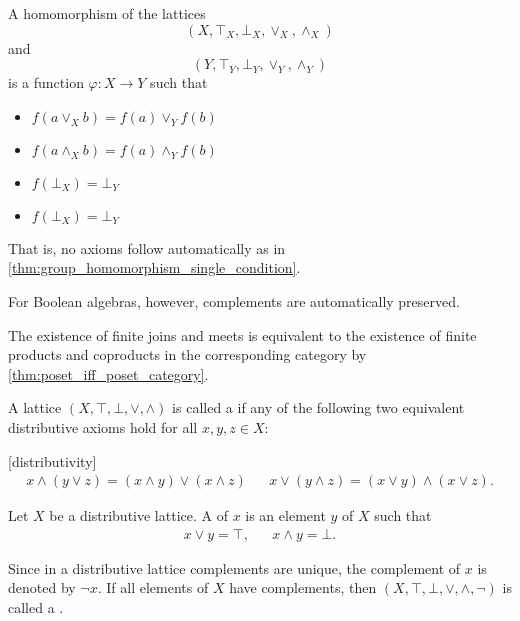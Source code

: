 \begin{proposition}\label{thm:lattice_homomorphism}
  A homomorphism of the lattices
  \begin{equation*}
    (X, \top_X, \bot_X, \lor_X, \land_X)
  \end{equation*}
  and
  \begin{equation*}
    (Y, \top_Y, \bot_Y, \lor_Y, \land_Y)
  \end{equation*}
  is a function \( \varphi: X \to Y \) such that
  \begin{itemize}
    \item \( f(a \lor_X b) = f(a) \lor_Y f(b) \)
    \item \( f(a \land_X b) = f(a) \land_Y f(b) \)
    \item \( f(\bot_X) = \bot_Y \)
    \item \( f(\bot_X) = \bot_Y \)
  \end{itemize}

  That is, no axioms follow automatically as in \cref{thm:group_homomorphism_single_condition}.

  For Boolean algebras, however, complements are automatically preserved.
\end{proposition}

\begin{remark}\label{def:lattice_categorical_product}
  The existence of finite joins and meets is equivalent to the existence of finite products and coproducts in the corresponding category by \cref{thm:poset_iff_poset_category}.
\end{remark}

\begin{definition}\label{def:distributive_lattice}\cite{nLab:distributive_lattice}
  A lattice \( (X, \top, \bot, \lor, \land) \) is called a  if any of the following two equivalent distributive axioms hold for all \( x, y, z \in X \):
  \begin{description}
    [distributivity]
    \begin{align*}
      x \land (y \lor z) = (x \land y) \lor (x \land z)
      &&
      x \lor (y \land z) = (x \lor y) \land (x \lor z).
    \end{align*}
  \end{description}
\end{definition}

\begin{definition}\label{def:boolean_algebra}\cite{nLab:boolean_algebra}
  Let \( X \) be a distributive lattice. A  of \( x \) is an element \( y \) of \( X \) such that
  \begin{align*}
    x \lor y = \top, && x \land y = \bot.
  \end{align*}

  Since in a distributive lattice complements are unique, the complement of \( x \) is denoted by \( \neg x \). If all elements of \( X \) have complements, then \( (X, \top, \bot, \lor, \land, \neg) \) is called a .
\end{definition}

